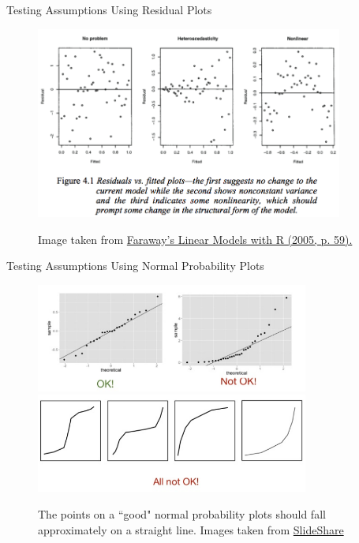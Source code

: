 \documentclass[xcolor=svgnames]{beamer}
\begin{document}
\begin{frame}[label=current]{Testing Assumptions Using Residual Plots}
\begin{figure}[htbp]
\caption{Image taken from \href{https://books.google.ca/books?id=i0DOBQAAQBAJ&printsec=frontcover&dq=Faraway\%27s+Linear+Models+with+R+(2005,+p.+59).\&hl=en\&sa=X\&ved=0ahUKEwinqMbTjq3iAhVhMX0KHedMCnkQ6AEIMjAB\#v=onepage\&q\&f=false}{Faraway's Linear Models with R (2005, p. 59).} }
\begin{center}
\includegraphics[width=0.9\textwidth]{img/resplot.png}
\label{default}
\end{center}
\end{figure}
\end{frame}

\begin{frame}[label=current]{Testing Assumptions Using Normal Probability Plots}
\begin{figure}[htbp]
\caption{The points on a ``good" normal probability plots should fall approximately on a straight line.   Images taken from \href{https://www.slideshare.net/saqibshahzad26/26-assumptions}{SlideShare} }
\begin{center}
\includegraphics[width=0.8\textwidth]{img/ppplot}\\
\includegraphics[width=0.8\textwidth]{img/notok}
\label{default}
\end{center}
\end{figure}
\end{frame}
\end{document}
